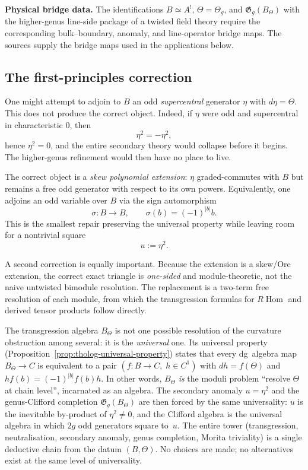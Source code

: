 \medskip

\noindent\textbf{Physical bridge data.}
The identifications \(B\simeq A^{!}\), \(\Theta=\Theta_{g}\), and
\(\mathfrak{G}_{g}(B_{\Theta})\) with the higher-genus line-side
package of a twisted field theory require the corresponding
bulk--boundary, anomaly, and line-operator bridge maps. The sources
\cite{Zeng23,CDG20,DNP25,costello-gaiotto,CP2020} supply the bridge
maps used in the applications below.

\subsection{The first-principles correction}

One might attempt to adjoin to \(B\) an odd \emph{supercentral} generator \(\eta\) with \(d\eta=\Theta\).
This does not produce the correct object.
Indeed, if \(\eta\) were odd and supercentral in characteristic \(0\), then
\[
\eta^{2}=-\eta^{2},
\]
hence \(\eta^{2}=0\), and the entire secondary theory would collapse before it begins.
The higher-genus refinement would then have no place to live.

The correct object is a \emph{skew polynomial extension}:
\(\eta\) graded-commutes with \(B\) but remains a free odd generator with respect to its own powers.
Equivalently, one adjoins an odd variable over \(B\) via the sign automorphism
\[
\sigma:B\longrightarrow B,\qquad \sigma(b)=(-1)^{|b|}b.
\]
This is the smallest repair preserving the universal property while leaving room for a nontrivial square
\[
u:=\eta^{2}.
\]

A second correction is equally important.
Because the extension is a skew/Ore extension, the correct exact triangle is \emph{one-sided} and module-theoretic, not the naive untwisted bimodule resolution.
The replacement is a two-term free resolution of each module, from which the transgression formulas for \(R\!\operatorname{Hom}\) and derived tensor products follow directly.

\begin{remark}
The transgression algebra $B_\Theta$ is not one possible
resolution of the curvature obstruction among several: it is
the \emph{universal} one. Its universal property
(Proposition~\ref{prop:tholog-universal-property}) states that
every dg~algebra map $B_\Theta \to C$ is equivalent to a pair
$(f\colon B \to C,\; h \in C^1)$ with $dh = f(\Theta)$ and
$hf(b) = (-1)^{|b|}f(b)h$. In other words, $B_\Theta$
\emph{is} the moduli problem ``resolve $\Theta$ at chain
level'', incarnated as an algebra. The secondary anomaly
$u = \eta^2$ and the genus-Clifford completion
$\mathfrak G_g(B_\Theta)$ are then forced by the same
universality: $u$ is the inevitable by-product of
$\eta^2 \ne 0$, and the Clifford algebra is the universal
algebra in which $2g$ odd generators square to~$u$. The
entire tower (transgression, neutralisation, secondary
anomaly, genus completion, Morita triviality) is a single
deductive chain from the datum $(B, \Theta)$. No choices are
made; no alternatives exist at the same level of universality.
\end{remark}

